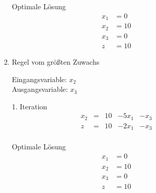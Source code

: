 \documentclass[a4paper]{scrartcl}
\begin{document}
\begin{enumerate}[label=\bfseries\arabic*.]
\begin{enumerate}
\begin{enumerate}[(i)]
\begin{enumerate}
                                Optimale Lösung
                                \begin{align*}
                                    x_1 &= 0 \\
                                    x_2 &= 10 \\
                                    x_3 &= 0 \\
                                    z   &= 10
                                \end{align*}

                            \item Regel vom größten Zuwachs

                                Eingangsvariable: $x_2$ \\
                                Ausgangsvariable: $x_3$

                                1. Iteration
                                \begin{equation}
                                    \begin{array}{rcrrr}
                                        x_2 & = & 10 & -5x_1 & -x_3  \\
                                        \hline                    
                                        z   & = & 10 & -2x_1 & -x_3  \\
                                    \end{array}
                                \end{equation}

                                Optimale Lösung
                                \begin{align*}
                                    x_1 &= 0 \\
                                    x_2 &= 10 \\
                                    x_3 &= 0 \\
                                    z   &= 10
                                \end{align*}

                        \end{enumerate}


\end{enumerate}
\end{enumerate}
\end{enumerate}
\end{document}
